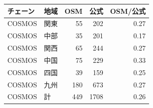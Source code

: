 \begin{tabular}{llrrr}
\toprule
チェーン & 地域 & OSM & 公式 & OSM/公式 \\
\midrule
COSMOS & 関東 & 55 & 202 & 0.27 \\
COSMOS & 中部 & 35 & 201 & 0.17 \\
COSMOS & 関西 & 65 & 244 & 0.27 \\
COSMOS & 中国 & 75 & 229 & 0.33 \\
COSMOS & 四国 & 39 & 159 & 0.25 \\
COSMOS & 九州 & 180 & 673 & 0.27 \\
\midrule
COSMOS & 計 & 449 & 1708 & 0.26 \\
\bottomrule
\end{tabular}
